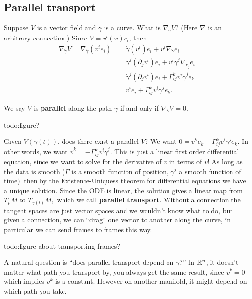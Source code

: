 \subsection{Parallel transport}
Suppose $V$ is a vector field and $\gamma $ is a curve. What is $\nabla _{\dot \gamma }V$? (Here $\nabla$ is an arbitrary connection.) Since $V=v^i (x)e_i $, then 
    \begin{align*}
        \nabla _{\dot \gamma }V=\nabla _{\dot \gamma }(v^i e_i )&=\dot \gamma (v^i )e_i +v^i \nabla _{\dot \gamma }e_i \\
                                                                &=\dot \gamma ^j (\partial _j v^i )e_i +v^i \dot \gamma ^j \nabla _{e_j }e_i \\
                                                                &=\dot \gamma ^j (\partial _j v^i )e_i +\Gamma _{ij}^kv^i \dot \gamma ^j e_k\\
                                                                &=\dot v^i  e_i +\Gamma _{ij}^kv^i \dot \gamma ^j e_k.
    \end{align*}
    \begin{definition}[]
        We say $V$ is \textbf{parallel} along the path $\gamma $ if and only if $\nabla _{\dot \gamma }V=0$.
    \end{definition}
    {\color{red}todo:figure?} 

    Given $V(\gamma (t))$, does there exist a parallel $V$? We want $0=\dot v^ke_k +\Gamma _{ij}^k v^i \dot \gamma ^j e_k$. In other words, we want $\dot v^k=-\Gamma _{ij}^kv^i \dot \gamma ^j $. This is just a linear first order differential equation, since we want to solve for the derivative of $v$ in terms of $v$! As long as the data is smooth ($\Gamma $ is a smooth function of position, $\gamma ^j $ a smooth function of time), then by the Existence-Uniquess theorem for differential equations we have a unique solution. Since the ODE is linear, the solution gives a linear map from $T_pM$ to $T_{\gamma (t)}M,$ which we call \textbf{parallel transport}. Without a connection the tangent spaces are just vector spaces and we wouldn't know what to do, but given a connection, we can ``drag'' one vector to another along the curve, in particular we can send frames to frames this way. 

    {\color{red}todo:figure about transporting frames?} 

    A natural question is ``does parallel transport depend on $\gamma $?'' In $\mathbb{R}^n $, it doesn't matter what path you transport by, you always get the same result, since $\dot v^k=0$ which implies $v^k$ is a constant. However on another manifold, it might depend on which path you take.

